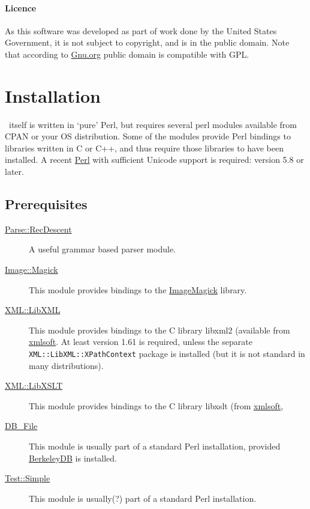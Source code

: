 \documentclass{article}
\begin{document}
\paragraph{Licence}
As this software was developed as part of work done by the
United States Government, it is not subject to copyright,
and is in the public domain.
Note that according to
\href{http://www.gnu.org/licences/license-list.html#PublicDomain}{Gnu.org}
public domain is compatible with GPL.

\section{Installation}\label{install}

\LaTeXML\ itself is written in `pure' Perl, but requires several
perl modules available from CPAN or your OS distribution.
Some of the modules provide Perl bindings to libraries
written in C or C++, and thus require those libraries to have been installed.
A recent \href{http://www.perl.org/}{Perl}
with sufficient Unicode support is required: version 5.8 or later.

\subsection{Prerequisites}

\begin{description}
\item[\href{http://search.cpan.org/search?query=Parse::RecDescent&mode=module}{Parse::RecDescent}]
    A useful grammar based parser module.
\item[\href{http://search.cpan.org/search?query=Image::Magick&mode=module}{Image::Magick}]
    This module provides bindings to the \href{http://www.imagemagick.org/}{ImageMagick} library.
\item[\href{http://search.cpan.org/search?query=XML::LibXML&mode=module}{XML::LibXML}]
    This module provides bindings to the C library libxml2
    (available from \href{http://www.xmlsoft.org}{xmlsoft}.
    At least version 1.61 is required, unless the separate \texttt{XML::LibXML::XPathContext}
    package is installed (but it is not standard in many distributions).
\item[\href{http://search.cpan.org/search?query=XML::LibXSLT&mode=module}{XML::LibXSLT}]
    This module provides bindings to the C library libxslt
    (from \href{http://www.xmlsoft.org}{xmlsoft},
\item[\href{http://search.cpan.org/search?query=DB_File&mode=module}{DB\_File}]
    This module is usually part of a standard Perl installation, provided
    \href{http://www.sleepycat.com}{BerkeleyDB} is installed.
\item[\href{http://search.cpan.org/search?query=Test::Simple&mode=module}{Test::Simple}]
    This module is usually(?) part of a standard Perl installation.
\end{description}
\end{document}
